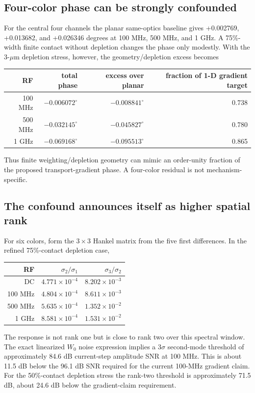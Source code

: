 \documentclass[11pt]{article}
\begin{document}
\subsection{Four-color phase can be strongly confounded}
For the central four channels the planar same-optics baseline gives +0.002769, +0.013682, and +0.026346 degrees at 100 MHz, 500 MHz, and 1 GHz. A 75\%-width finite contact without depletion changes the phase only modestly. With the 3-$\mu$m depletion stress, however, the geometry/depletion excess becomes
\begin{center}
\begin{tabular}{rrrr}
\toprule
RF & total phase & excess over planar & fraction of 1-D gradient target \\
\midrule
100 MHz & $-0.006072^\circ$ & $-0.008841^\circ$ & 0.738 \\
500 MHz & $-0.032145^\circ$ & $-0.045827^\circ$ & 0.780 \\
1 GHz & $-0.069168^\circ$ & $-0.095513^\circ$ & 0.865 \\
\bottomrule
\end{tabular}
\end{center}
Thus finite weighting/depletion geometry can mimic an order-unity fraction of the proposed transport-gradient phase. A four-color residual is not mechanism-specific.

\subsection{The confound announces itself as higher spatial rank}
For six colors, form the $3\times3$ Hankel matrix from the five first differences. In the refined 75\%-contact depletion case,
\begin{center}
\begin{tabular}{rrr}
\toprule
RF & $\sigma_2/\sigma_1$ & $\sigma_3/\sigma_2$ \\
\midrule
DC & $4.771\times10^{-4}$ & $8.202\times10^{-3}$ \\
100 MHz & $4.804\times10^{-4}$ & $8.611\times10^{-3}$ \\
500 MHz & $5.635\times10^{-4}$ & $1.352\times10^{-2}$ \\
1 GHz & $8.581\times10^{-4}$ & $1.531\times10^{-2}$ \\
\bottomrule
\end{tabular}
\end{center}
The response is not rank one but is close to rank two over this spectral window. The exact linearized $W_0$ noise expression implies a $3\sigma$ second-mode threshold of approximately 84.6 dB current-step amplitude SNR at 100 MHz. This is about 11.5 dB below the 96.1 dB SNR required for the current 100-MHz gradient claim. For the 50\%-contact depletion stress the rank-two threshold is approximately 71.5 dB, about 24.6 dB below the gradient-claim requirement.
\end{document}
